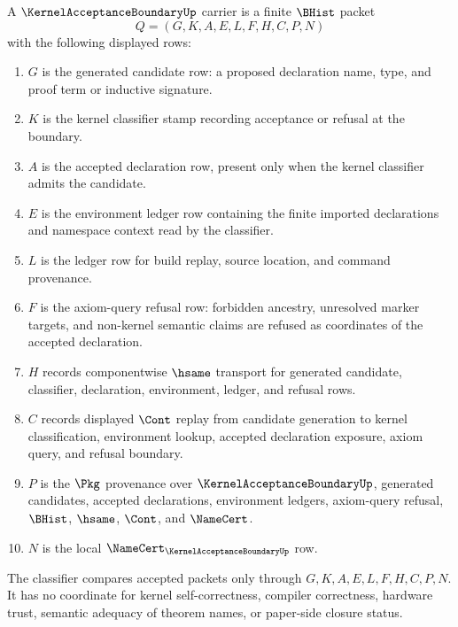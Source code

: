 \begin{definition}
\label{def:kernel-acceptance-boundary-carrier}
A $\KernelAcceptanceBoundaryUp$ carrier is a finite $\BHist$ packet
$$
Q=(G,K,A,E,L,F,H,C,P,N)
$$
with the following displayed rows:
\begin{enumerate}
\item $G$ is the generated candidate row: a proposed declaration name, type, and proof term or inductive signature.
\item $K$ is the kernel classifier stamp recording acceptance or refusal at the boundary.
\item $A$ is the accepted declaration row, present only when the kernel classifier admits the candidate.
\item $E$ is the environment ledger row containing the finite imported declarations and namespace context read by the classifier.
\item $L$ is the ledger row for build replay, source location, and command provenance.
\item $F$ is the axiom-query refusal row: forbidden ancestry, unresolved marker targets, and non-kernel semantic claims are refused as coordinates of the accepted declaration.
\item $H$ records componentwise $\hsame$ transport for generated candidate, classifier, declaration, environment, ledger, and refusal rows.
\item $C$ records displayed $\Cont$ replay from candidate generation to kernel classification, environment lookup, accepted declaration exposure, axiom query, and refusal boundary.
\item $P$ is the $\Pkg$ provenance over $\KernelAcceptanceBoundaryUp$, generated candidates, accepted declarations, environment ledgers, axiom-query refusal, $\BHist$, $\hsame$, $\Cont$, and $\NameCert$.
\item $N$ is the local $\NameCert_{\KernelAcceptanceBoundaryUp}$ row.
\end{enumerate}
The classifier compares accepted packets only through $G,K,A,E,L,F,H,C,P,N$. It has no coordinate for kernel self-correctness, compiler correctness, hardware trust, semantic adequacy of theorem names, or paper-side closure status.
\end{definition}

